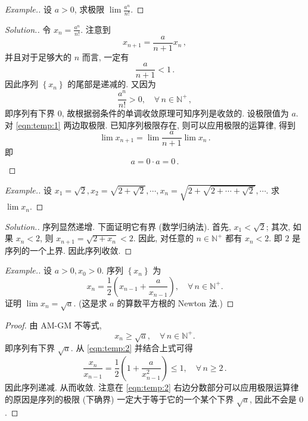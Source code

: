 \documentclass{book}
\newcommand{\Any}{\forall\,}
\newcommand{\set}[1]{\left\{#1\right\}}
\newcommand{\N}{\mathbb{N}}
\renewcommand{\ge}{\geqslant}
\renewcommand{\le}{\leqslant}
\newenvironment{example}
{
  \renewcommand{\qedsymbol}{}
  \begin{proof}[Example.]
}
{\end{proof}}
\newenvironment{solution}{\begin{proof}[Solution.]}{\end{proof}}
\numberwithin{equation}{section}
\numberwithin{figure}{section}
\theoremstyle{definition}
\begin{document}
\begin{example}
  设 $a>0$, 求极限 $\lim\frac{a^n}{n!}$.
\end{example}
\begin{solution}
  令 $x_n=\frac{a^n}{n!}$.
  注意到
  \begin{equation}\label{eqn:temp:1}
    x_{n+1}=\frac{a}{n+1}x_n\,,
  \end{equation}
  并且对于足够大的 $n$ 而言, 一定有
  \begin{equation*}
    \frac{a}{n+1}<1\,.
  \end{equation*}
  因此序列 $\set{x_n}$ 的尾部是递减的.
  又因为
  \begin{equation*}
    \frac{a^n}{n!}>0,\quad\Any n\in\N^+\,,
  \end{equation*}
  即序列有下界 $0$, 故根据弱条件的单调收敛原理可知序列是收敛的. 设极限值为 $a$.
  对 \cref{eqn:temp:1} 两边取极限. 已知序列极限存在, 则可以应用极限的运算律, 得到
  \begin{equation*}
    \lim x_{n+1}=\lim\frac{a}{n+1}\lim x_n\,.
  \end{equation*}
  即
  \begin{equation*}
    a=0\cdot a=0\,.
  \end{equation*}
\end{solution}

\begin{example}
  设 $x_1=\sqrt{2},x_2=\sqrt{2+\sqrt{2}},\cdots,x_n=\sqrt{2+\sqrt{2+\cdots+\sqrt{2}}},\cdots$. 求 $\lim x_n$. 
\end{example}
\begin{solution}
  序列显然递增. 下面证明它有界 (数学归纳法). 首先, $x_1<\sqrt{2}$; 其次, 如果 $x_n<2$, 则 $x_{n+1}=\sqrt{2+x_n}<2$. 因此, 对任意的 $n\in\N^+$ 都有 $x_n<2$. 即 $2$ 是序列的一个上界. 因此序列收敛.
\end{solution}

\begin{example}
  设 $a>0,x_0>0$. 序列 $\set{x_n}$ 为
  \begin{equation}\label{eqn:temp:2}
    x_n=\frac{1}{2}\left( x_{n-1}+\frac{a}{x_{n-1}} \right), \quad\Any n\in\N^+.
  \end{equation}
  证明 $\lim x_n=\sqrt{a}$.
  (这是求 $a$ 的算数平方根的 Newton 法.)
\end{example}
\begin{proof}
  由 AM-GM 不等式, 
  \begin{equation*}
    x_n\ge\sqrt{a},\quad\Any n\in\N^+.
  \end{equation*}
  即序列有下界 $\sqrt{a}$.
  从 \cref{eqn:temp:2} 并结合上式可得
  \begin{equation*}
    \frac{x_n}{x_{n-1}}=\frac{1}{2}\left( 1+\frac{a}{x_{n-1}^2} \right)\le1,\quad\Any n\ge2\,.
  \end{equation*}
  因此序列递减. 从而收敛.
  注意在 \cref{eqn:temp:2} 右边分数部分可以应用极限运算律的原因是序列的极限 (下确界) 一定大于等于它的一个某个下界 $\sqrt{a}$, 因此不会是 $0$.
\end{proof}
\end{document}
